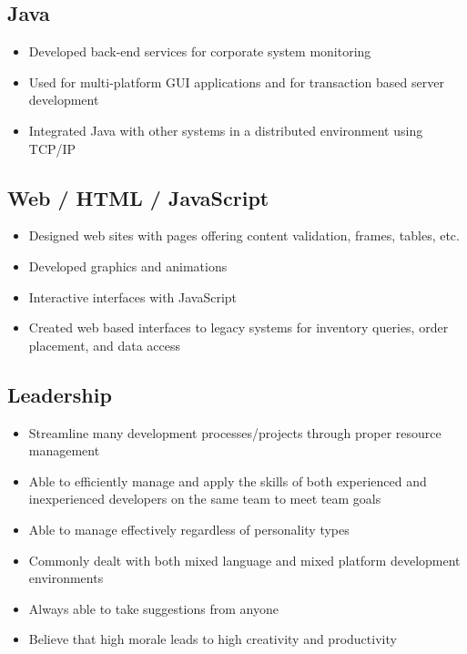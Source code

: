 \documentclass[10pt]{report}
\begin{document}
\subsection*{Java}
\begin{itemize}
\item Developed back-end services for corporate system monitoring
\item Used for multi-platform GUI applications and for transaction based server development
\item Integrated Java with other systems in a distributed environment using TCP/IP
\end{itemize}

\subsection*{Web / HTML / JavaScript}
\begin{itemize}
\item Designed web sites with pages offering content validation, frames, tables, etc.
\item Developed graphics and animations
\item Interactive interfaces with JavaScript
\item Created web based interfaces to legacy systems for inventory queries, order placement, and data access
\end{itemize}

\subsection*{Leadership}
\begin{itemize}
\item Streamline many development processes/projects through proper resource management
\item Able to efficiently manage and apply the skills of both experienced and inexperienced developers on the same team to meet team goals
\item Able to manage effectively regardless of personality types
\item Commonly dealt with both mixed language and mixed platform development environments
\item Always able to take suggestions from anyone
\item Believe that high morale leads to high creativity and productivity
\end{itemize}
\end{document}
